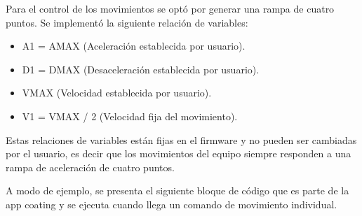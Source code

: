 %
%
%

Para el control de los movimientos se optó por generar una rampa de cuatro puntos. Se implementó la siguiente relación de variables:

\begin{itemize}
\item A1 = AMAX  (Aceleración establecida por usuario).
\item D1 = DMAX  (Desaceleración establecida por usuario).
\item VMAX 	  (Velocidad establecida por usuario).
\item V1 = VMAX / 2 (Velocidad fija del movimiento).

\end{itemize}

Estas relaciones de variables están fijas en el firmware y no pueden ser cambiadas por el usuario, es decir que los movimientos del equipo siempre responden a una rampa de aceleración de cuatro puntos.


A modo de ejemplo, se presenta el siguiente bloque de código que es parte de la app coating y  se ejecuta cuando llega un comando de movimiento individual.
 
